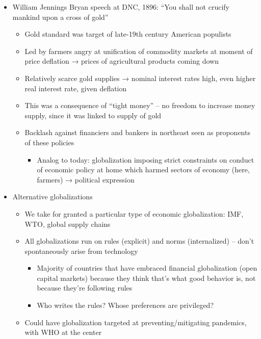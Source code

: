 \begin{itemize}
\tightlist
\item
  William Jennings Bryan speech at DNC, 1896: ``You shall not crucify
  mankind upon a cross of gold''

  \begin{itemize}
  \tightlist
  \item
    Gold standard was target of late-19th century American populists
  \item
    Led by farmers angry at unification of commodity markets at moment
    of price deflation → prices of agricultural products coming down
  \item
    Relatively scarce gold supplies → nominal interest rates high, even
    higher real interest rate, given deflation
  \item
    This was a consequence of ``tight money'' -- no freedom to increase
    money supply, since it was linked to supply of gold
  \item
    Backlash against financiers and bankers in northeast seen as
    proponents of these policies

    \begin{itemize}
    \tightlist
    \item
      Analog to today: globalization imposing strict constraints on
      conduct of economic policy at home which harmed sectors of economy
      (here, farmers) → political expression
    \end{itemize}
  \end{itemize}
\item
  Alternative globalizations

  \begin{itemize}
  \tightlist
  \item
    We take for granted a particular type of economic globalization:
    IMF, WTO, global supply chains
  \item
    All globalizations run on rules (explicit) and norms (internalized)
    -- don't spontaneously arise from technology

    \begin{itemize}
    \tightlist
    \item
      Majority of countries that have embraced financial globalization
      (open capital markets) because they think that's what good
      behavior is, not because they're following rules
    \item
      Who writes the rules? Whose preferences are privileged?
    \end{itemize}
  \item
    Could have globalization targeted at preventing/mitigating
    pandemics, with WHO at the center


\end{itemize}
\end{itemize}
